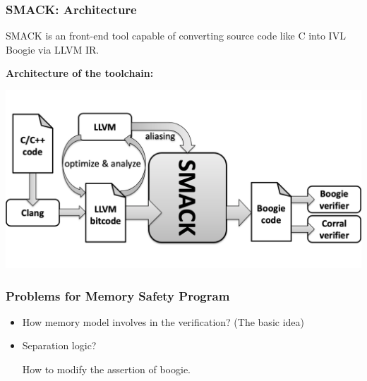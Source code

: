 \documentclass[11pt]{beamer}
\begin{document}
\begin{frame}\frametitle{SMACK: Architecture}

SMACK is an front-end tool capable of converting source code like C into IVL Boogie via LLVM IR.

\textbf{Architecture of the toolchain:}

\begin{center}
\includegraphics[scale=0.20]{smack_arch.png}
\end{center}
 


\end{frame}

\begin{frame}\frametitle{Problems for Memory Safety Program}
\begin{itemize}
\item How memory model involves in the verification? (The basic idea)
\item Separation logic? 

How to modify the assertion of boogie.
\end{itemize}


\end{frame}
\end{document}
